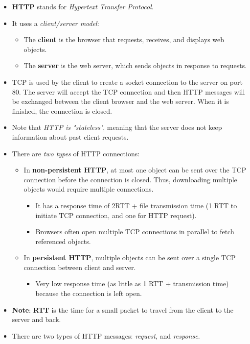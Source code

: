 \documentclass{article}
\begin{document}
\begin{itemize}
\item {\bf HTTP} stands for {\it Hypertext Transfer Protocol}.
\item It uses a {\it client/server model}:
\begin{itemize}
\item The {\bf client} is the browser that requests, receives, and displays web objects.
\item The {\bf server} is the web server, which sends objects in response to requests.
\end{itemize}
\item TCP is used by the client to create a socket connection to the server on port 80. The server will accept the TCP connection and then HTTP messages will be exchanged between the client browser and the web server. When it is finished, the connection is closed.
\item Note that {\it HTTP is "stateless"}, meaning that the server does not keep information about past client requests.
\item There are {\it two types} of HTTP connections:
\begin{itemize}
\item In {\bf non-persistent HTTP}, at most one object can be sent over the TCP connection before the connection is closed. Thus, downloading multiple objects would require multiple connections.
\begin{itemize}
\item It has a response time of 2RTT + file transmission time (1 RTT to initiate TCP connection, and one for HTTP request).
\item Browsers often open multiple TCP connections in parallel to fetch referenced objects.
\end{itemize}
\item In {\bf persistent HTTP}, multiple objects can be sent over a single TCP connection between client and server.
\begin{itemize}
\item Very low response time (as little as 1 RTT + transmission time) because the connection is left open.
\end{itemize}
\end{itemize}
\item {\bf Note}: {\bf RTT} is the time for a small packet to travel from the client to the server and back.
\item There are two types of HTTP messages: {\it request}, and {\it response}.

\end{itemize}
\end{document}
